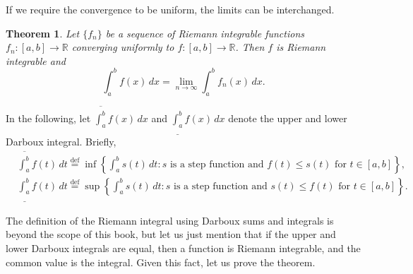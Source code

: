 \documentclass[12pt,openany]{book}
\newcommand{\R}{{\mathbb{R}}}
\theoremstyle{plain}
\newtheorem{thm}{Theorem}[section]
\theoremstyle{remark}
\theoremstyle{definition}
\theoremstyle{exercise}
\theoremstyle{example}
\begin{document}
If we require the convergence to be uniform, the limits can
be interchanged.

\begin{thm} \label{integralinterchange:thm}
Let $\{ f_n \}$ be a sequence of Riemann integrable
functions
$f_n \colon [a,b] \to \R$
converging uniformly to $f \colon [a,b]
\to \R$.  Then $f$ is Riemann integrable and
\begin{equation*}
\int_a^b f(x) \, dx = \lim_{n\to\infty} \int_a^b f_n(x) \, dx .
\end{equation*}
\end{thm}

In the following, let 
$\overline{\int_a^b} f(x)\, dx$ and 
$\underline{\int_a^b} f(x)\, dx$ denote the upper and lower Darboux integral.
Briefly,
\begin{align*}
& \overline{\int_a^b} f(t) \,dt
\overset{\text{def}}{=}
\inf \left\{ \int_a^b s(t) \, dt : s
\text{ is a step function and } f(t) \leq s(t) \text{ for } t \in
[a,b] \right\} ,
\\
& \underline{\int_a^b} f(t) \,dt
\overset{\text{def}}{=}
\sup \left\{ \int_a^b s(t) \, dt : s
\text{ is a step function and } s(t) \leq f(t) \text{ for } t \in
[a,b] \right\} .
\end{align*}


The definition of the Riemann integral using Darboux sums and integrals is
beyond the scope of this book, but let us just mention that 
if the upper and lower Darboux integrals are equal, then a function is
Riemann integrable, and the common value is the integral.  Given this fact,
let us prove the theorem.
\end{document}
